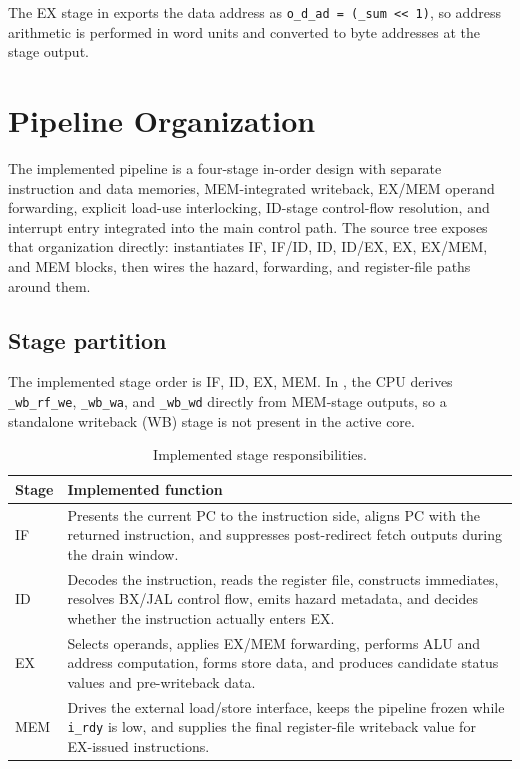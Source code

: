 \documentclass[11pt,a4paper]{article}
\begin{document}
The EX stage in  exports the data address as \texttt{o\_d\_ad = (\_sum << 1)}, so address arithmetic is performed in word units and converted to byte addresses at the stage output.

\section{Pipeline Organization}
The implemented pipeline is a four-stage in-order design with separate instruction and data memories, MEM-integrated writeback, EX/MEM operand forwarding, explicit load-use interlocking, ID-stage control-flow resolution, and interrupt entry integrated into the main control path. The source tree exposes that organization directly:  instantiates IF, IF/ID, ID, ID/EX, EX, EX/MEM, and MEM blocks, then wires the hazard, forwarding, and register-file paths around them.

\subsection{Stage partition}

The implemented stage order is IF, ID, EX, MEM. In , the CPU derives \texttt{\_wb\_rf\_we}, \texttt{\_wb\_wa}, and \texttt{\_wb\_wd} directly from MEM-stage outputs, so a standalone writeback (WB) stage is not present in the active core.

\begin{table}[H]
\centering
\begin{tabularx}{\linewidth}{@{}>{\ttfamily}lX@{}}
\toprule
Stage & Implemented function \\
\midrule
IF & Presents the current PC to the instruction side, aligns PC with the returned instruction, and suppresses post-redirect fetch outputs during the drain window. \\
ID & Decodes the instruction, reads the register file, constructs immediates, resolves BX/JAL control flow, emits hazard metadata, and decides whether the instruction actually enters EX. \\
EX & Selects operands, applies EX/MEM forwarding, performs ALU and address computation, forms store data, and produces candidate status values and pre-writeback data. \\
MEM & Drives the external load/store interface, keeps the pipeline frozen while \texttt{i\_rdy} is low, and supplies the final register-file writeback value for EX-issued instructions. \\
\bottomrule
\end{tabularx}
\caption{Implemented stage responsibilities.}
\end{table}
\end{document}
